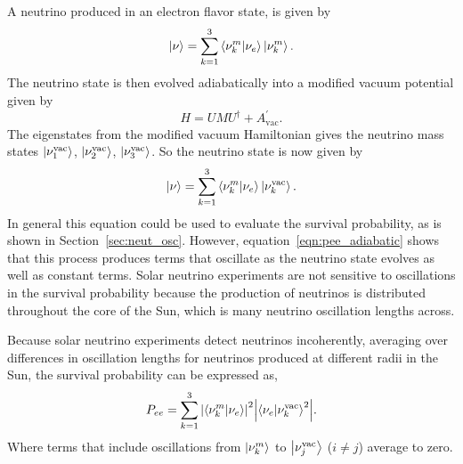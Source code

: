 A neutrino produced in an electron flavor state, is given by
\begin{equation}
    \ket{\nu} = \sum_{k=1}^{3}\braket{\nu^{m}_{k}}{\nu_{e}}\ket{\nu^{m}_{k}}\text{.}
\end{equation}
The neutrino state is then evolved adiabatically into a modified
vacuum potential given by
\begin{equation}
    H = U M U^{\dagger} + A^{\prime}_{\mathrm{vac}}\text{.}
\end{equation}
The eigenstates from the modified vacuum Hamiltonian gives the neutrino mass
states $\ket{\nu^{\mathrm{vac}}_{1}}$, $\ket{\nu^{\mathrm{vac}}_{2}}$, $\ket{\nu^{\mathrm{vac}}_{3}}$.
So the neutrino state is now given by
\begin{equation}
    \ket{\nu} = \sum_{k=1}^{3}\braket{\nu^{m}_{k}}{\nu_{e}}\ket{\nu^{\mathrm{vac}}_{k}}\text{.}
\end{equation}
In general this equation could be used to evaluate the
survival probability, as is shown in Section~\ref{sec:neut_osc}.
However, equation~\ref{eqn:pee_adiabatic} shows that this process produces
terms that oscillate as the neutrino state evolves as well as constant
terms.
Solar neutrino experiments are not sensitive to oscillations in the survival
probability because the production of neutrinos is distributed
throughout the core of the Sun, which is many neutrino oscillation lengths
across.


Because solar neutrino experiments detect neutrinos incoherently, averaging
over differences in oscillation lengths for neutrinos produced
at different radii in the Sun, the survival probability can be expressed as,
\begin{equation}
    P_{ee} = \sum_{k=1}^{3}\abs{\braket{\nu^{m}_{k}}{\nu_{e}}}^{2}\abs{\braket{\nu_{e}}{\nu^{\mathrm{vac}}_{k}}^{2}}\text{.}
\end{equation}
Where terms that include oscillations from $\ket{\nu^{m}_{k}}$ to $\ket{\nu^\mathrm{vac}_{j}}$ ($i \ne j$)
average to zero.

